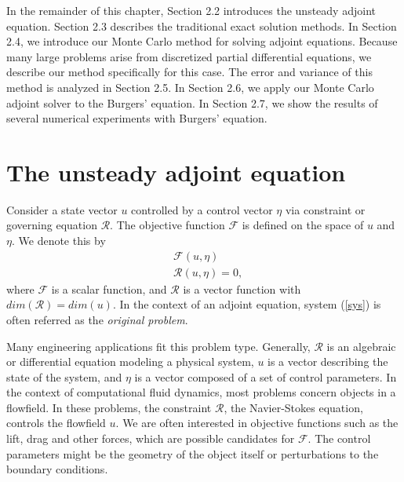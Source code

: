     In the remainder of this chapter, Section 2.2 introduces the unsteady
    adjoint equation.
    Section 2.3 describes the traditional exact solution methods.  In
    Section 2.4, we introduce our Monte Carlo method for solving adjoint
    equations.  Because many large problems arise from discretized partial
    differential equations, we describe our method specifically for this case.
    The error and variance of this method is analyzed in Section 2.5.  In
    Section 2.6, we apply our Monte Carlo adjoint solver to the Burgers'
    equation.  In Section 2.7, we show the results of several numerical
    experiments with Burgers' equation.





\section{The unsteady adjoint equation}
    Consider a state vector $u$ controlled by a control vector $\eta$
    via constraint or governing equation $\mathcal{R}$.  The objective function
    $\mathcal{F}$ is defined on the space of $u$ and $\eta$.  We denote this by
    \begin{equation} \label{sys} \begin{aligned}
        & \mathcal{F}(u,\eta) \\
        & \mathcal{R}(u,\eta) = 0 ,
    \end{aligned} \end{equation}
    where $\mathcal{F}$ is a scalar function, and $\mathcal{R}$ is a
    vector function with $dim(\mathcal{R}) = dim(u)$.  In the context of
    an adjoint equation, system (\ref{sys}) is often referred as the
    \emph{original problem}.
    
    Many engineering applications fit this problem type.  Generally,
    $\mathcal{R}$ is an algebraic or differential equation modeling a
    physical system, $u$ is a vector describing the state of the system,
    and $\eta$ is a vector composed of a set of control parameters.  In
    the context of computational fluid dynamics, most problems concern
    objects in a flowfield.  In these problems, the constraint
    $\mathcal{R}$, the Navier-Stokes equation, controls the flowfield
    $u$.  We are often interested in objective functions such as
    the lift, drag and other forces, which are possible candidates for
    $\mathcal{F}$.  The control parameters might be the geometry of the
    object itself or perturbations to the boundary conditions.
    
